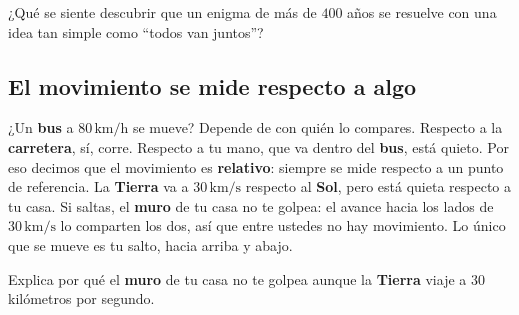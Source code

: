 \documentclass[
  spanish,
  letterpaper,
  12pt,
  oneside,
  open=any,
  DIV=15]{scrbook}
\begin{document}
\begin{tcolorbox}[enhanced jigsaw, arc=.35mm, bottomrule=.15mm, bottomtitle=1mm, breakable, colback=white, colbacktitle=quarto-callout-note-color!10!white, colframe=quarto-callout-note-color-frame, coltitle=black, left=2mm, leftrule=.75mm, opacityback=0, opacitybacktitle=0.6, rightrule=.15mm, title=\textcolor{quarto-callout-note-color}{\faInfo}\hspace{0.5em}{Pregunta socioemocional}, titlerule=0mm, toprule=.15mm, toptitle=1mm]

¿Qué se siente descubrir que un enigma de más de \(400\) años se
resuelve con una idea tan simple como ``todos van juntos''?

\end{tcolorbox}

\subsection{El movimiento se mide respecto a
algo}\label{el-movimiento-se-mide-respecto-a-algo}

¿Un \textcolor[HTML]{7C3AED}{\textbf{bus}} a \(80\,\text{km/h}\) se
mueve? Depende de con quién lo compares. Respecto a la
\textcolor[HTML]{DC2626}{\textbf{carretera}}, sí, corre. Respecto a tu
mano, que va dentro del \textbf{bus}, está quieto. Por eso decimos que
el movimiento es \textbf{relativo}: siempre se mide respecto a un punto
de referencia. La \textcolor[HTML]{7C3AED}{\textbf{Tierra}} va a
\(30\,\text{km/s}\) respecto al \textcolor[HTML]{DC2626}{\textbf{Sol}},
pero está quieta respecto a tu casa. Si saltas, el
\textcolor[HTML]{DC2626}{\textbf{muro}} de tu casa no te golpea: el
avance hacia los lados de \(30\,\text{km/s}\) lo comparten los dos, así
que entre ustedes no hay movimiento. Lo único que se mueve es tu salto,
hacia arriba y abajo.

\begin{tcolorbox}[enhanced jigsaw, arc=.35mm, bottomrule=.15mm, bottomtitle=1mm, breakable, colback=white, colbacktitle=quarto-callout-warning-color!10!white, colframe=quarto-callout-warning-color-frame, coltitle=black, left=2mm, leftrule=.75mm, opacityback=0, opacitybacktitle=0.6, rightrule=.15mm, title=\textcolor{quarto-callout-warning-color}{\faExclamationTriangle}\hspace{0.5em}{Pregunta de comprensión}, titlerule=0mm, toprule=.15mm, toptitle=1mm]

Explica por qué el \textbf{muro} de tu casa no te golpea aunque la
\textbf{Tierra} viaje a \(30\) kilómetros por segundo.

\end{tcolorbox}
\end{document}
